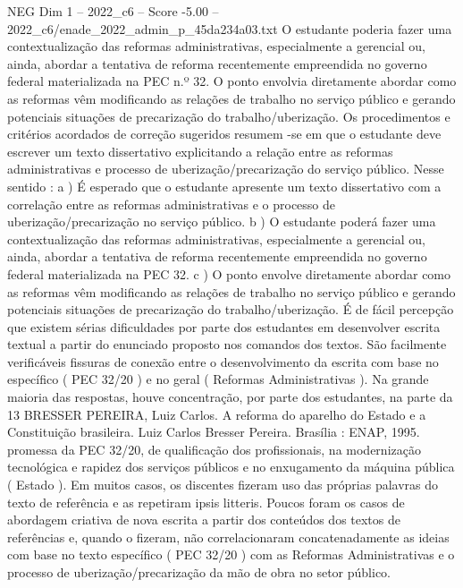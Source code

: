 \begin{textsample}{NEG Dim 1 – 2022\_c6 – Score -5.00 – 2022\_c6/enade\_2022\_admin\_p\_45da234a03.txt}
O estudante poderia fazer uma contextualização das reformas administrativas, especialmente a gerencial ou, ainda, abordar a tentativa de reforma recentemente empreendida no governo federal materializada na PEC n.º 32.
O ponto envolvia diretamente abordar como as reformas vêm modificando as relações de trabalho no serviço público e gerando potenciais situações de precarização do trabalho/uberização.
Os procedimentos e critérios acordados de correção sugeridos resumem -se em que o estudante deve escrever um texto dissertativo explicitando a relação entre as reformas administrativas e processo de uberização/precarização do serviço público.
Nesse sentido : a ) É esperado que o estudante apresente um texto dissertativo com a correlação entre as reformas administrativas e o processo de uberização/precarização no serviço público. b ) O estudante poderá fazer uma contextualização das reformas administrativas, especialmente a gerencial ou, ainda, abordar a tentativa de reforma recentemente empreendida no governo federal materializada na PEC 32. c ) O ponto envolve diretamente abordar como as reformas vêm modificando as relações de trabalho no serviço público e gerando potenciais situações de precarização do trabalho/uberização.
É de fácil percepção que existem sérias dificuldades por parte dos estudantes em desenvolver escrita textual a partir do enunciado proposto nos comandos dos textos.
São facilmente verificáveis fissuras de conexão entre o desenvolvimento da escrita com base no específico ( PEC 32/20 ) e no geral ( Reformas Administrativas ).
Na grande maioria das respostas, houve concentração, por parte dos estudantes, na parte da 13 BRESSER PEREIRA, Luiz Carlos.
A reforma do aparelho do Estado e a Constituição brasileira.
Luiz Carlos Bresser Pereira.
Brasília : ENAP, 1995. promessa da PEC 32/20, de qualificação dos profissionais, na modernização tecnológica e rapidez dos serviços públicos e no enxugamento da máquina pública ( Estado ).
Em muitos casos, os discentes fizeram uso das próprias palavras do texto de referência e as repetiram ipsis litteris.
Poucos foram os casos de abordagem criativa de nova escrita a partir dos conteúdos dos textos de referências e, quando o fizeram, não correlacionaram concatenadamente as ideias com base no texto específico ( PEC 32/20 ) com as Reformas Administrativas e o processo de uberização/precarização da mão de obra no setor público.

\end{textsample}
